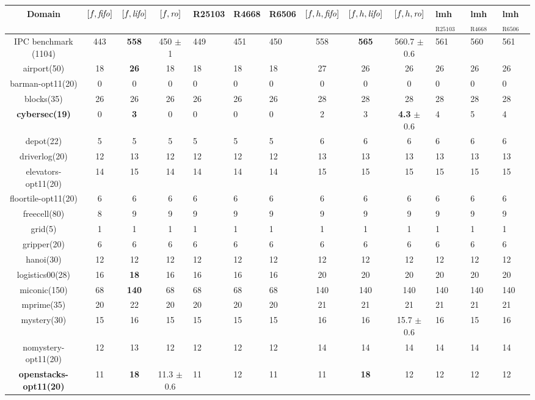 \begin{center}
\begin{tabular}{|c|cccHHH|cccHHH|}
\hline
Domain & \([f,{\text{\textit{fifo}}}]\) & \([f,{\text{\textit{lifo}}}]\) & \([f,{\text{\textit{ro}}}]\) & R25103 & R4668 & R6506 & \([f,h,{\text{\textit{fifo}}}]\) & \([f,h,{\text{\textit{lifo}}}]\) & \([f,h,{\text{\textit{ro}}}]\) & lmh\(_{\text{R25103}}\) & lmh\(_{\text{R4668}}\) & lmh\(_{\text{R6506}}\)\\
\hline
IPC benchmark (1104) & 443 & \textbf{558} & 450 \(\pm\) 1 & 449 & 451 & 450 & 558 & \textbf{565} & 560.7 \(\pm\) 0.6 & 561 & 560 & 561\\
\hline
airport(50) & 18 & \textbf{26} & 18 & 18 & 18 & 18 & 27 & 26 & 26 & 26 & 26 & 26\\
barman-opt11(20) & 0 & 0 & 0 & 0 & 0 & 0 & 0 & 0 & 0 & 0 & 0 & 0\\
blocks(35) & 26 & 26 & 26 & 26 & 26 & 26 & 28 & 28 & 28 & 28 & 28 & 28\\
\textbf{cybersec(19)} & 0 & \textbf{3} & 0 & 0 & 0 & 0 & 2 & 3 & \textbf{4.3} \(\pm\) 0.6 & 4 & 5 & 4\\
depot(22) & 5 & 5 & 5 & 5 & 5 & 5 & 6 & 6 & 6 & 6 & 6 & 6\\
driverlog(20) & 12 & 13 & 12 & 12 & 12 & 12 & 13 & 13 & 13 & 13 & 13 & 13\\
elevators-opt11(20) & 14 & 15 & 14 & 14 & 14 & 14 & 15 & 15 & 15 & 15 & 15 & 15\\
floortile-opt11(20) & 6 & 6 & 6 & 6 & 6 & 6 & 6 & 6 & 6 & 6 & 6 & 6\\
freecell(80) & 8 & 9 & 9 & 9 & 9 & 9 & 9 & 9 & 9 & 9 & 9 & 9\\
grid(5) & 1 & 1 & 1 & 1 & 1 & 1 & 1 & 1 & 1 & 1 & 1 & 1\\
gripper(20) & 6 & 6 & 6 & 6 & 6 & 6 & 6 & 6 & 6 & 6 & 6 & 6\\
hanoi(30) & 12 & 12 & 12 & 12 & 12 & 12 & 12 & 12 & 12 & 12 & 12 & 12\\
logistics00(28) & 16 & \textbf{18} & 16 & 16 & 16 & 16 & 20 & 20 & 20 & 20 & 20 & 20\\
miconic(150) & 68 & \textbf{140} & 68 & 68 & 68 & 68 & 140 & 140 & 140 & 140 & 140 & 140\\
mprime(35) & 20 & 22 & 20 & 20 & 20 & 20 & 21 & 21 & 21 & 21 & 21 & 21\\
mystery(30) & 15 & 16 & 15 & 15 & 15 & 15 & 16 & 16 & 15.7 \(\pm\) 0.6 & 16 & 15 & 16\\
nomystery-opt11(20) & 12 & 13 & 12 & 12 & 12 & 12 & 14 & 14 & 14 & 14 & 14 & 14\\
\textbf{openstacks-opt11(20)} & 11 & \textbf{18} & 11.3 \(\pm\) 0.6 & 11 & 12 & 11 & 11 & \textbf{18} & 12 & 12 & 12 & 12\\

\end{tabular}
\end{center}
